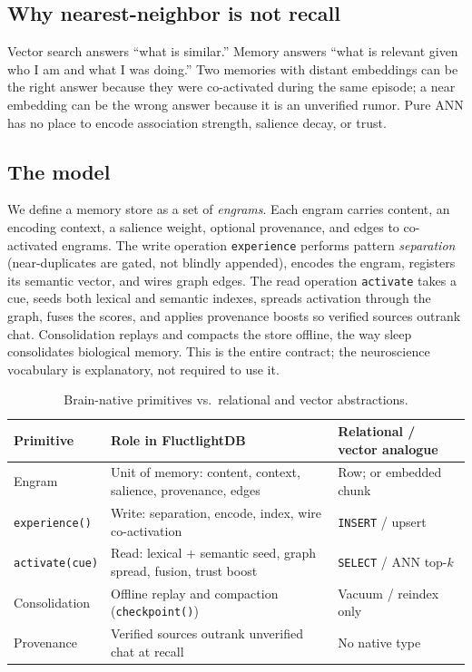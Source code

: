 \documentclass[11pt]{article}
\begin{document}
\subsection{Why nearest-neighbor is not recall}
Vector search answers ``what is similar.'' Memory answers ``what is relevant given
who I am and what I was doing.'' Two memories with distant embeddings can be the
right answer because they were co-activated during the same episode; a near
embedding can be the wrong answer because it is an unverified rumor. Pure ANN has
no place to encode association strength, salience decay, or trust.

\subsection{The model}
We define a memory store as a set of \emph{engrams}. Each engram carries content,
an encoding context, a salience weight, optional provenance, and edges to
co-activated engrams. The write operation \texttt{experience} performs pattern
\emph{separation} (near-duplicates are gated, not blindly appended), encodes the
engram, registers its semantic vector, and wires graph edges. The read operation
\texttt{activate} takes a cue, seeds both lexical and semantic indexes, spreads
activation through the graph, fuses the scores, and applies provenance boosts so
verified sources outrank chat. Consolidation replays and compacts the store
offline, the way sleep consolidates biological memory. This is the entire
contract; the neuroscience vocabulary is explanatory, not required to use it.

\begin{table}[h]
\centering
\caption{Brain-native primitives vs.\ relational and vector abstractions.}
\begin{tabular}{p{2.2cm}p{4.2cm}p{4.8cm}}
\toprule
\textbf{Primitive} & \textbf{Role in FluctlightDB} & \textbf{Relational / vector analogue} \\
\midrule
Engram & Unit of memory: content, context, salience, provenance, edges & Row; or embedded chunk \\
\texttt{experience()} & Write: separation, encode, index, wire co-activation & \texttt{INSERT} / upsert \\
\texttt{activate(cue)} & Read: lexical + semantic seed, graph spread, fusion, trust boost & \texttt{SELECT} / ANN top-$k$ \\
Consolidation & Offline replay and compaction (\texttt{checkpoint()}) & Vacuum / reindex only \\
Provenance & Verified sources outrank unverified chat at recall & No native type \\
\bottomrule
\end{tabular}
\end{table}
\end{document}
